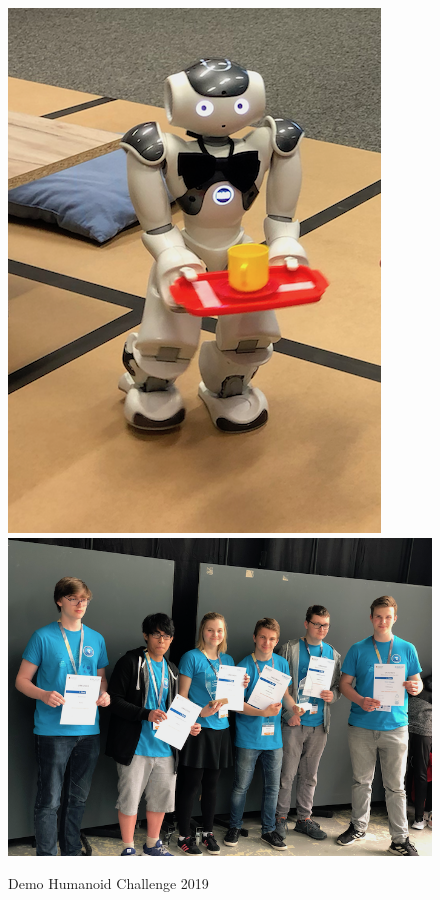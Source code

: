 \documentclass[11pt]{article}
\begin{document}
\begin{figure}
\begin{center}
\includegraphics[scale=0.38]{img/rcjWaiter.png}
\includegraphics[scale=0.38]{img/rcjCeremony.png}
\end{center}
\caption{Demo Humanoid Challenge 2019}
\label{fig:rcjWinners}
\end{figure}
\end{document}
